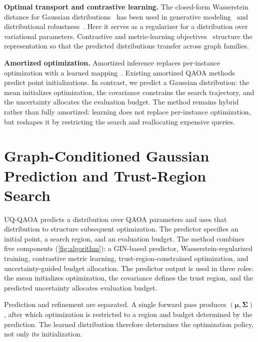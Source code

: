 \documentclass[aps,prx,reprint,superscriptaddress,longbibliography]{revtex4-2}
\newcommand{\QAOA}{\textnormal{\textsc{QAOA}}}
\newcommand{\GIN}{\textnormal{\textsc{GIN}}}
\newcommand{\UQQAOA}{\textnormal{\textsc{UQ-QAOA}}}
\begin{document}
\textbf{Optimal transport and contrastive learning.}
The closed-form Wasserstein distance for Gaussian
distributions~\cite{dowson1982} has been used in generative
modeling~\cite{arjovsky2017,frogner2015} and distributional
robustness~\cite{villani2009,cuturi2013,peyre2019}. Here it serves as a
regularizer for a distribution over variational parameters.
Contrastive and metric-learning objectives~\cite{chen2020simclr,oord2018,you2020,suresh2021,khosla2020}
structure the representation so that the predicted distributions
transfer across graph families.

\textbf{Amortized optimization.}
Amortized inference replaces per-instance optimization with a learned
mapping~\cite{amos2023,chen2022,finn2017,shu2022}. Existing amortized
\QAOA{} methods predict point initializations. In contrast, we predict a
Gaussian distribution: the mean initializes optimization, the
covariance constrains the search trajectory, and the uncertainty
allocates the evaluation budget. The method remains hybrid rather than
fully amortized: learning does not replace per-instance optimization,
but reshapes it by restricting the search and reallocating expensive
queries.

\section{Graph-Conditioned Gaussian Prediction and Trust-Region Search}
\label{sec:method}

\UQQAOA{} predicts a distribution over \QAOA{} parameters and uses that
distribution to structure subsequent optimization. The predictor
specifies an initial point, a search region, and an evaluation budget.
The method combines five components (\cref{fig:algorithm}): a
\GIN{}-based predictor, Wasserstein-regularized training, contrastive
metric learning, trust-region-constrained optimization, and
uncertainty-guided budget allocation.
The predictor output is used in three roles: the mean initializes
optimization, the covariance defines the trust region, and the
predicted uncertainty allocates evaluation budget.

Prediction and refinement are separated. A single forward pass produces
$(\bm\mu,\bm\Sigma)$, after which optimization is restricted to a region
and budget determined by the prediction. The learned distribution
therefore determines the optimization policy, not only its
initialization.
\end{document}
